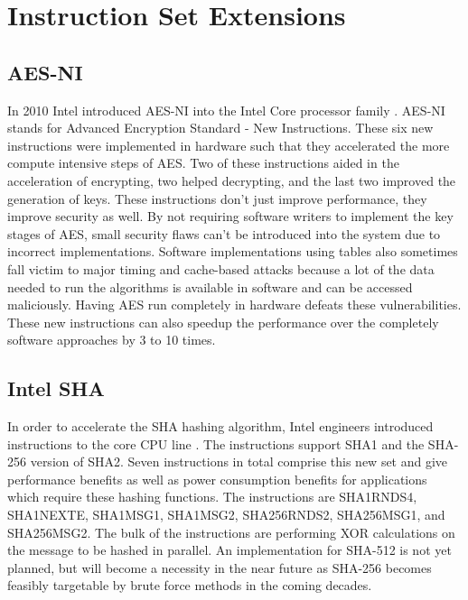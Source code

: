 \documentclass[journal]{IEEEtran}
\begin{document}
\section{Instruction Set Extensions}

\subsection{AES-NI}

In 2010 Intel introduced AES-NI into the Intel Core processor family \cite{AES1} \cite{AES2}.  AES-NI stands for Advanced Encryption Standard - New Instructions.  These six new instructions were implemented in hardware such that they accelerated the more compute intensive steps of AES.  Two of these instructions aided in the acceleration of encrypting, two helped decrypting, and the last two improved the generation of keys.  These instructions don't just improve performance, they improve security as well.  By not requiring software writers to implement the key stages of AES, small security flaws can't be introduced into the system due to incorrect implementations.  Software implementations using tables also sometimes fall victim to major timing and cache-based attacks because a lot of the data needed to run the algorithms is available in software and can be accessed maliciously.  Having AES run completely in hardware defeats these vulnerabilities. These new instructions can also speedup the performance over the completely software approaches by 3 to 10 times.

\subsection{Intel SHA}

In order to accelerate the SHA hashing algorithm, Intel engineers introduced instructions to the core CPU line \cite{intelSHA}.  The instructions support SHA1 and the SHA-256 version of SHA2.  Seven instructions in total comprise this new set and give performance benefits as well as power consumption benefits for applications which require these hashing functions.  The instructions are SHA1RNDS4, SHA1NEXTE, SHA1MSG1, SHA1MSG2, SHA256RNDS2, SHA256MSG1, and SHA256MSG2.  The bulk of the instructions are performing XOR calculations on the message to be hashed in parallel.  An implementation for SHA-512 is not yet planned, but will become a necessity in the near future as SHA-256 becomes feasibly targetable by brute force methods in the coming decades.
\end{document}
